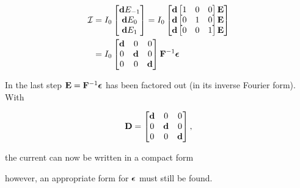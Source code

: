 \begin{equation}\label{eqn:ece1254projectReport:900}
\begin{aligned}
\mathcal{I} &=
I_0
\begin{bmatrix}
\Bd E_{-1} \\
\Bd E_{0} \\
\Bd E_{1} \\
\end{bmatrix}
=
I_0
\begin{bmatrix}
\Bd \begin{bmatrix} 1 & 0 & 0 \end{bmatrix} \BE \\
\Bd \begin{bmatrix} 0 & 1 & 0 \end{bmatrix} \BE \\
\Bd \begin{bmatrix} 0 & 0 & 1 \end{bmatrix} \BE
\end{bmatrix} \\
&=
I_0
\begin{bmatrix}
\Bd & 0 & 0 \\
0 & \Bd & 0 \\
0 & 0 & \Bd
\end{bmatrix}
\BF^{-1} \Bepsilon
\end{aligned}
\end{equation}

In the last step \( \mathbf{E} = \mathbf{F}^{-1} \boldsymbol{\epsilon} \) has been factored out (in its inverse Fourier form).
With

\begin{dmath}\label{eqn:ece1254projectReport:920}
\BD =
\begin{bmatrix}
\Bd & 0 & 0 \\
0 & \Bd & 0 \\
0 & 0   & \Bd \\
\end{bmatrix},
\end{dmath}

the current can now be written in a compact form


however, an appropriate form for \( \boldsymbol{\epsilon} \) must still be found.

